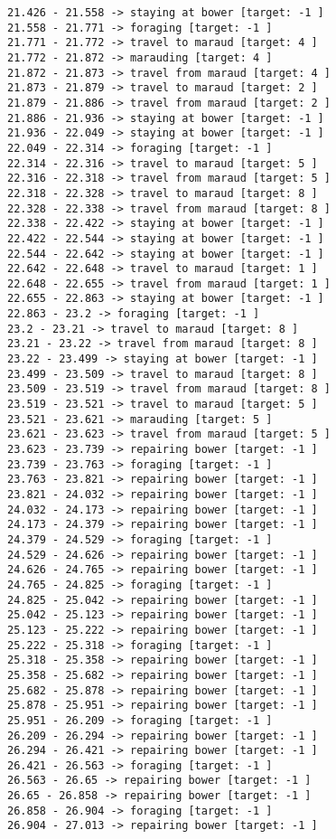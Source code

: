 \documentclass[11pt]{article}
\begin{document}
\begin{Verbatim}[commandchars=\\\{\}]
21.426 - 21.558 -> staying at bower [target: -1 ]
21.558 - 21.771 -> foraging [target: -1 ]
21.771 - 21.772 -> travel to maraud [target: 4 ]
21.772 - 21.872 -> marauding [target: 4 ]
21.872 - 21.873 -> travel from maraud [target: 4 ]
21.873 - 21.879 -> travel to maraud [target: 2 ]
21.879 - 21.886 -> travel from maraud [target: 2 ]
21.886 - 21.936 -> staying at bower [target: -1 ]
21.936 - 22.049 -> staying at bower [target: -1 ]
22.049 - 22.314 -> foraging [target: -1 ]
22.314 - 22.316 -> travel to maraud [target: 5 ]
22.316 - 22.318 -> travel from maraud [target: 5 ]
22.318 - 22.328 -> travel to maraud [target: 8 ]
22.328 - 22.338 -> travel from maraud [target: 8 ]
22.338 - 22.422 -> staying at bower [target: -1 ]
22.422 - 22.544 -> staying at bower [target: -1 ]
22.544 - 22.642 -> staying at bower [target: -1 ]
22.642 - 22.648 -> travel to maraud [target: 1 ]
22.648 - 22.655 -> travel from maraud [target: 1 ]
22.655 - 22.863 -> staying at bower [target: -1 ]
22.863 - 23.2 -> foraging [target: -1 ]
23.2 - 23.21 -> travel to maraud [target: 8 ]
23.21 - 23.22 -> travel from maraud [target: 8 ]
23.22 - 23.499 -> staying at bower [target: -1 ]
23.499 - 23.509 -> travel to maraud [target: 8 ]
23.509 - 23.519 -> travel from maraud [target: 8 ]
23.519 - 23.521 -> travel to maraud [target: 5 ]
23.521 - 23.621 -> marauding [target: 5 ]
23.621 - 23.623 -> travel from maraud [target: 5 ]
23.623 - 23.739 -> repairing bower [target: -1 ]
23.739 - 23.763 -> foraging [target: -1 ]
23.763 - 23.821 -> repairing bower [target: -1 ]
23.821 - 24.032 -> repairing bower [target: -1 ]
24.032 - 24.173 -> repairing bower [target: -1 ]
24.173 - 24.379 -> repairing bower [target: -1 ]
24.379 - 24.529 -> foraging [target: -1 ]
24.529 - 24.626 -> repairing bower [target: -1 ]
24.626 - 24.765 -> repairing bower [target: -1 ]
24.765 - 24.825 -> foraging [target: -1 ]
24.825 - 25.042 -> repairing bower [target: -1 ]
25.042 - 25.123 -> repairing bower [target: -1 ]
25.123 - 25.222 -> repairing bower [target: -1 ]
25.222 - 25.318 -> foraging [target: -1 ]
25.318 - 25.358 -> repairing bower [target: -1 ]
25.358 - 25.682 -> repairing bower [target: -1 ]
25.682 - 25.878 -> repairing bower [target: -1 ]
25.878 - 25.951 -> repairing bower [target: -1 ]
25.951 - 26.209 -> foraging [target: -1 ]
26.209 - 26.294 -> repairing bower [target: -1 ]
26.294 - 26.421 -> repairing bower [target: -1 ]
26.421 - 26.563 -> foraging [target: -1 ]
26.563 - 26.65 -> repairing bower [target: -1 ]
26.65 - 26.858 -> repairing bower [target: -1 ]
26.858 - 26.904 -> foraging [target: -1 ]
26.904 - 27.013 -> repairing bower [target: -1 ]

\end{Verbatim}
\end{document}
